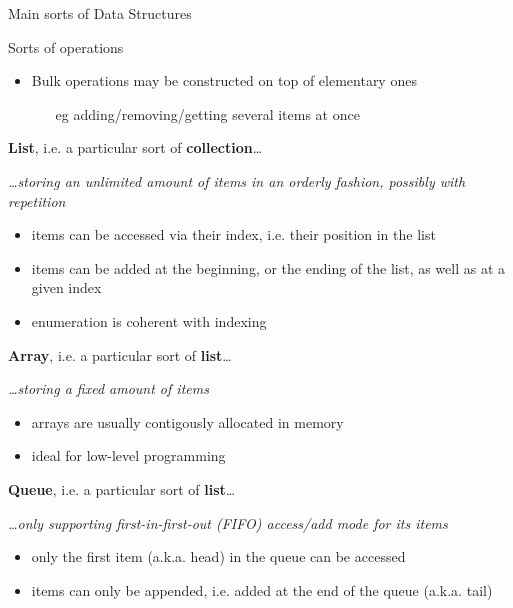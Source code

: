 \documentclass[presentation]{beamer}
\begin{document}
\begin{frame}[allowframebreaks]{Main sorts of Data Structures}
\begin{exampleblock}{Sorts of operations}
\begin{itemize}
      \item \alert{Bulk} operations may be constructed on top of \alert{elementary} ones
      \begin{itemize}
        \item[eg] adding/removing/getting several items at once
      \end{itemize}
    \end{itemize}
  \end{exampleblock}

  \begin{block}{\textbf{List}, i.e. a particular sort of \textbf{collection}\ldots}
    \begin{center}\itshape
      \ldots storing an \alert{unlimited} amount of items in an \alert{orderly} fashion, possibly \alert{with repetition}
    \end{center}
    \begin{itemize}
      \item items can be accessed via their \alert{index}, i.e. their position in the list
      \item items can be added at the \alert{beginning}, or the \alert{ending} of the list, as well as at a \alert{given index}
      \item enumeration is coherent with indexing
    \end{itemize}
  \end{block}

  \begin{block}{\textbf{Array}, i.e. a particular sort of \textbf{list}\ldots}
    \begin{center}\itshape
      \ldots storing a \alert{fixed} amount of items
    \end{center}
    \begin{itemize}
      \item arrays are usually \alert{contigously allocated} in memory
      \item ideal for low-level programming
    \end{itemize}
  \end{block}

  \begin{block}{\textbf{Queue}, i.e. a particular sort of \textbf{list}\ldots}
    \begin{center}\itshape
      \ldots only supporting \alert{first-in-first-out (FIFO)} access/add mode for its items
    \end{center}
    \begin{itemize}
      \item only the \alert{first item} (a.k.a. \alert{head}) in the queue can be accessed
      \item items can only be \alert{appended}, i.e. added at the end of the queue (a.k.a. \alert{tail})
    \end{itemize}
  \end{block}


\end{frame}
\end{document}
